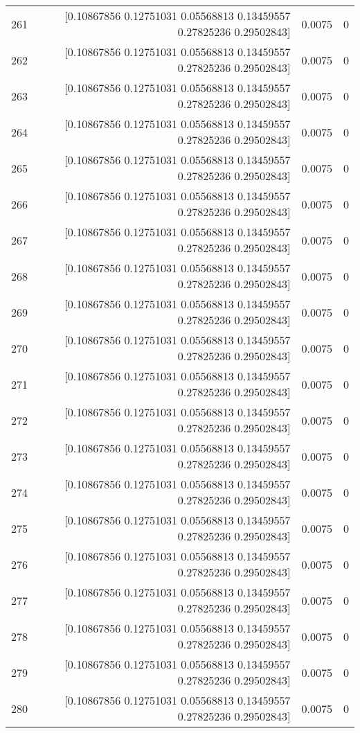 \begin{longtable}{lrrr}
261 & [0.10867856 0.12751031 0.05568813 0.13459557 0.27825236 0.29502843] & 0.0075 & 0 \\
262 & [0.10867856 0.12751031 0.05568813 0.13459557 0.27825236 0.29502843] & 0.0075 & 0 \\
263 & [0.10867856 0.12751031 0.05568813 0.13459557 0.27825236 0.29502843] & 0.0075 & 0 \\
264 & [0.10867856 0.12751031 0.05568813 0.13459557 0.27825236 0.29502843] & 0.0075 & 0 \\
265 & [0.10867856 0.12751031 0.05568813 0.13459557 0.27825236 0.29502843] & 0.0075 & 0 \\
266 & [0.10867856 0.12751031 0.05568813 0.13459557 0.27825236 0.29502843] & 0.0075 & 0 \\
267 & [0.10867856 0.12751031 0.05568813 0.13459557 0.27825236 0.29502843] & 0.0075 & 0 \\
268 & [0.10867856 0.12751031 0.05568813 0.13459557 0.27825236 0.29502843] & 0.0075 & 0 \\
269 & [0.10867856 0.12751031 0.05568813 0.13459557 0.27825236 0.29502843] & 0.0075 & 0 \\
270 & [0.10867856 0.12751031 0.05568813 0.13459557 0.27825236 0.29502843] & 0.0075 & 0 \\
271 & [0.10867856 0.12751031 0.05568813 0.13459557 0.27825236 0.29502843] & 0.0075 & 0 \\
272 & [0.10867856 0.12751031 0.05568813 0.13459557 0.27825236 0.29502843] & 0.0075 & 0 \\
273 & [0.10867856 0.12751031 0.05568813 0.13459557 0.27825236 0.29502843] & 0.0075 & 0 \\
274 & [0.10867856 0.12751031 0.05568813 0.13459557 0.27825236 0.29502843] & 0.0075 & 0 \\
275 & [0.10867856 0.12751031 0.05568813 0.13459557 0.27825236 0.29502843] & 0.0075 & 0 \\
276 & [0.10867856 0.12751031 0.05568813 0.13459557 0.27825236 0.29502843] & 0.0075 & 0 \\
277 & [0.10867856 0.12751031 0.05568813 0.13459557 0.27825236 0.29502843] & 0.0075 & 0 \\
278 & [0.10867856 0.12751031 0.05568813 0.13459557 0.27825236 0.29502843] & 0.0075 & 0 \\
279 & [0.10867856 0.12751031 0.05568813 0.13459557 0.27825236 0.29502843] & 0.0075 & 0 \\
280 & [0.10867856 0.12751031 0.05568813 0.13459557 0.27825236 0.29502843] & 0.0075 & 0 \\

\end{longtable}
